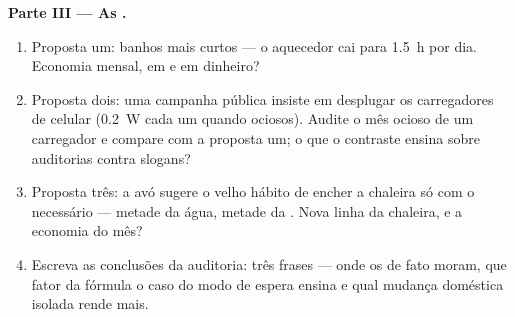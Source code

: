 \begin{problem}
\medskip\noindent\textbf{Parte III --- As .}
\begin{enumerate}[resume]
  \item Proposta um: banhos mais curtos --- o aquecedor cai para
        \qty{1.5}{h} por dia. Economia mensal, em  e em
        dinheiro?
  \item Proposta dois: uma campanha pública insiste em desplugar os
        carregadores de celular (\qty{0.2}{W} cada um quando
        ociosos). Audite o mês ocioso de um carregador e compare com
        a proposta um; o que o contraste ensina sobre auditorias
        contra slogans?
  \item Proposta três: a avó sugere o velho hábito de encher a
        chaleira só com o necessário --- metade da água, metade da
        . Nova linha da chaleira, e a economia do mês?
  \item Escreva as conclusões da auditoria: três frases --- onde os
         de fato moram, que fator da fórmula o caso do
        modo de espera ensina e qual mudança doméstica isolada rende
        mais.
\end{enumerate}
\end{problem}
